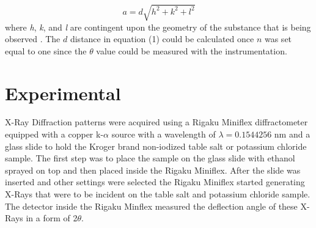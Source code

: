 \documentclass[twocolumn]{article}
\begin{document}
\begin{equation}\label{2}
a=d\sqrt{h^2+k^2+l^2}
\end{equation}
where \textit{h}, \textit{k}, and \textit{l} are contingent upon the geometry of the substance that is being observed \cite{X-RayCryst}. The $d$ distance in equation (1) could be calculated once $n$ was set equal to one since the $\theta$ value could be measured with the instrumentation.
\section*{Experimental}
X-Ray Diffraction patterns were acquired using a Rigaku Miniflex diffractometer equipped with a copper k-$\alpha$ source with a wavelength of $\lambda=0.1544256$ nm and a glass slide to hold the Kroger brand non-iodized table salt or potassium chloride sample. The first step was to place the sample on the glass slide with ethanol sprayed on top and then placed inside the Rigaku Miniflex. After the slide was inserted and other settings were selected the Rigaku Miniflex started generating X-Rays that were to be incident on the table salt and potassium chloride sample. The detector inside the Rigaku Minflex measured the deflection angle of these X-Rays in a form of 2$\theta$. 
\end{document}
